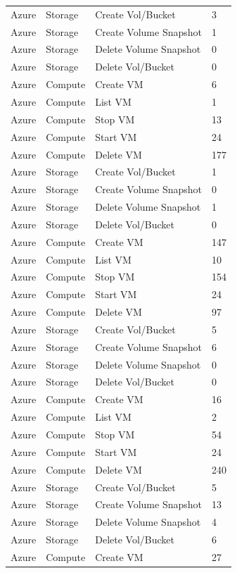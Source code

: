\begin{table}[htb]
\begin{tabular} {p{3cm}|p{3cm}|p{5cm}|p{3cm}}
Azure & Storage & Create Vol/Bucket & 3  \\
Azure & Storage & Create Volume Snapshot & 1  \\
Azure & Storage & Delete Volume Snapshot & 0  \\
Azure & Storage & Delete Vol/Bucket & 0  \\
Azure & Compute & Create VM & 6  \\
Azure & Compute & List VM & 1  \\
Azure & Compute & Stop VM & 13  \\
Azure & Compute & Start VM & 24  \\
Azure & Compute & Delete VM & 177  \\
Azure & Storage & Create Vol/Bucket & 1  \\
Azure & Storage & Create Volume Snapshot & 0  \\
Azure & Storage & Delete Volume Snapshot & 1  \\
Azure & Storage & Delete Vol/Bucket & 0  \\
Azure & Compute & Create VM & 147  \\
Azure & Compute & List VM & 10  \\
Azure & Compute & Stop VM & 154  \\
Azure & Compute & Start VM & 24  \\
Azure & Compute & Delete VM & 97  \\
Azure & Storage & Create Vol/Bucket & 5  \\
Azure & Storage & Create Volume Snapshot & 6  \\
Azure & Storage & Delete Volume Snapshot & 0  \\
Azure & Storage & Delete Vol/Bucket & 0  \\
Azure & Compute & Create VM & 16  \\
Azure & Compute & List VM & 2  \\
Azure & Compute & Stop VM & 54  \\
Azure & Compute & Start VM & 24  \\
Azure & Compute & Delete VM & 240  \\
Azure & Storage & Create Vol/Bucket & 5  \\
Azure & Storage & Create Volume Snapshot & 13  \\
Azure & Storage & Delete Volume Snapshot & 4  \\
Azure & Storage & Delete Vol/Bucket & 6  \\
Azure & Compute & Create VM & 27  \\

\end{tabular}
\end{table}

